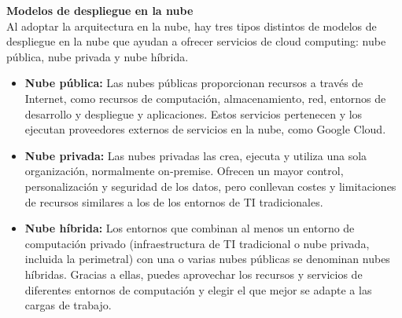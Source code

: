 \documentclass[12pt,letterpaper]{article}
\begin{document}
\textbf{Modelos de despliegue en la nube}  \\
Al adoptar la arquitectura en la nube, hay tres tipos distintos de modelos de despliegue en la nube que ayudan a ofrecer servicios de cloud computing: nube pública, nube privada y nube híbrida.\\
\begin{itemize}
    \item \textbf{Nube pública:} Las nubes públicas proporcionan recursos a través de Internet, como recursos de computación, almacenamiento, red, entornos de desarrollo y despliegue y aplicaciones. Estos servicios pertenecen y los ejecutan proveedores externos de servicios en la nube, como Google Cloud.
\end{itemize}
\begin{itemize}
    \item \textbf{Nube privada:} Las nubes privadas las crea, ejecuta y utiliza una sola organización, normalmente on‐premise. Ofrecen un mayor control, personalización y seguridad de los datos, pero conllevan costes y limitaciones de recursos similares a los de los entornos de TI tradicionales.
\end{itemize}
\begin{itemize}
    \item \textbf{Nube híbrida:} Los entornos que combinan al menos un entorno de computación privado (infraestructura de TI tradicional o nube privada, incluida la perimetral) con una o varias nubes públicas se denominan nubes híbridas. Gracias a ellas, puedes aprovechar los recursos y servicios de diferentes entornos de computación y elegir el que mejor se adapte a las cargas de trabajo.
\end{itemize}
\end{document}
